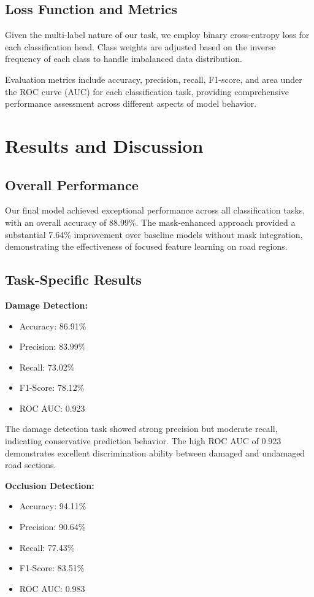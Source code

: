 \documentclass[12pt,twocolumn]{article}
\begin{document}
\subsection{Loss Function and Metrics}

Given the multi-label nature of our task, we employ binary cross-entropy loss for each classification head. Class weights are adjusted based on the inverse frequency of each class to handle imbalanced data distribution.

Evaluation metrics include accuracy, precision, recall, F1-score, and area under the ROC curve (AUC) for each classification task, providing comprehensive performance assessment across different aspects of model behavior.

\section{Results and Discussion}

\subsection{Overall Performance}

Our final model achieved exceptional performance across all classification tasks, with an overall accuracy of 88.99\%. The mask-enhanced approach provided a substantial 7.64\% improvement over baseline models without mask integration, demonstrating the effectiveness of focused feature learning on road regions.

\subsection{Task-Specific Results}

\textbf{Damage Detection:}
\begin{itemize}
\item Accuracy: 86.91\%
\item Precision: 83.99\%
\item Recall: 73.02\%
\item F1-Score: 78.12\%
\item ROC AUC: 0.923
\end{itemize}

The damage detection task showed strong precision but moderate recall, indicating conservative prediction behavior. The high ROC AUC of 0.923 demonstrates excellent discrimination ability between damaged and undamaged road sections.

\textbf{Occlusion Detection:}
\begin{itemize}
\item Accuracy: 94.11\%
\item Precision: 90.64\%
\item Recall: 77.43\%
\item F1-Score: 83.51\%
\item ROC AUC: 0.983
\end{itemize}
\end{document}
